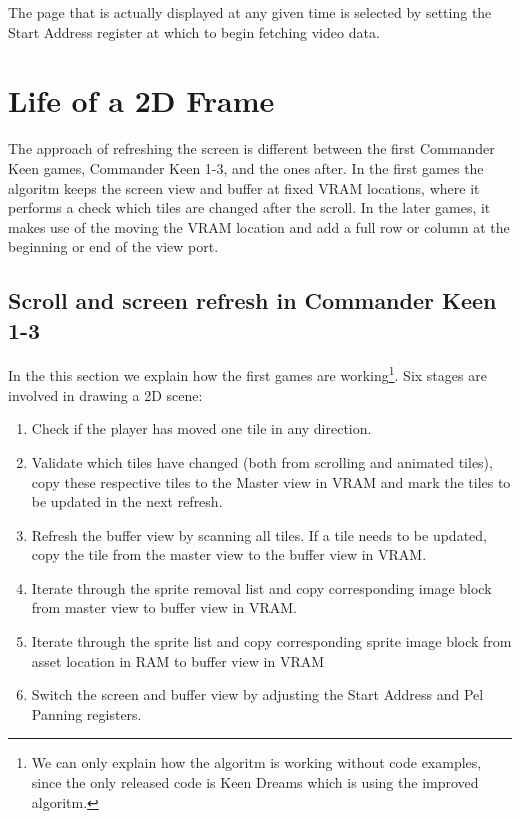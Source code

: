 \documentclass[book.tex]{subfiles}
\begin{document}
The page that is actually displayed at any given time is selected by setting the Start Address register at which to begin fetching video data.\\




\section{Life of a 2D Frame}
The approach of refreshing the screen is different between the first Commander Keen games, Commander Keen 1-3, and the ones after. In the first games the algoritm keeps the screen view and buffer at fixed VRAM locations, where it performs a check which tiles are changed after the scroll. In the later games, it makes use of the moving the VRAM location and add a full row or column at the beginning or end of the view port. 
\\
\subsection{Scroll and screen refresh in Commander Keen 1-3}
In the this section we explain how the first games are working\footnote{We can only explain how the algoritm is working without code examples, since the only released code is Keen Dreams which is using the improved algoritm.}. Six stages are involved in drawing a 2D scene:
\begin{enumerate}
\item Check if the player has moved one tile in any direction.
\item Validate which tiles have changed (both from scrolling and animated tiles), copy these respective tiles to the Master view in VRAM and mark the tiles to be updated in the next refresh.
\item Refresh the buffer view by scanning all tiles. If a tile needs to be updated, copy the tile from the master view to the buffer view in VRAM.
\item Iterate through the sprite removal list and copy corresponding image block from master view to buffer view in VRAM. 
\item Iterate through the sprite list and copy corresponding sprite image block from asset location in RAM to buffer view in VRAM
\item Switch the screen and buffer view by adjusting the Start Address and Pel Panning registers.
\end{enumerate}
\end{document}
